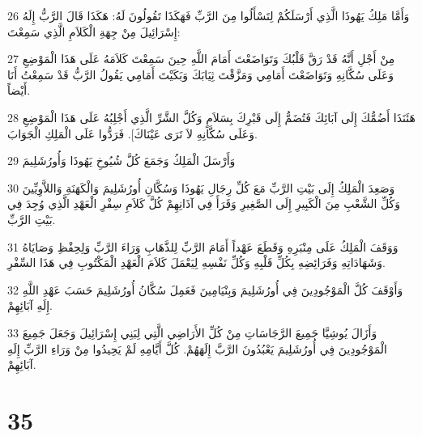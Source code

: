 \par 26 وَأَمَّا مَلِكُ يَهُوذَا الَّذِي أَرْسَلَكُمْ لِتَسْأَلُوا مِنَ الرَّبِّ فَهَكَذَا تَقُولُونَ لَهُ: هَكَذَا قَالَ الرَّبُّ إِلَهُ إِسْرَائِيلَ مِنْ جِهَةِ الْكَلاَمِ الَّذِي سَمِعْتَ:
\par 27 مِنْ أَجْلِ أَنَّهُ قَدْ رَقَّ قَلْبُكَ وَتَوَاضَعْتَ أَمَامَ اللَّهِ حِينَ سَمِعْتَ كَلاَمَهُ عَلَى هَذَا الْمَوْضِعِ وَعَلَى سُكَّانِهِ وَتَوَاضَعْتَ أَمَامِي وَمَزَّقْتَ ثِيَابَكَ وَبَكَيْتَ أَمَامِي يَقُولُ الرَّبُّ قَدْ سَمِعْتُ أَنَا أَيْضاً.
\par 28 هَئَنَذَا أَضُمُّكَ إِلَى آبَائِكَ فَتُضَمُّ إِلَى قَبْرِكَ بِسَلاَمٍ وَكُلَّ الشَّرِّ الَّذِي أَجْلِبُهُ عَلَى هَذَا الْمَوْضِعِ وَعَلَى سُكَّانِهِ لاَ تَرَى عَيْنَاكَ]. فَرَدُّوا عَلَى الْمَلِكِ الْجَوَابَ.
\par 29 وَأَرْسَلَ الْمَلِكُ وَجَمَعَ كُلَّ شُيُوخِ يَهُوذَا وَأُورُشَلِيمَ
\par 30 وَصَعِدَ الْمَلِكُ إِلَى بَيْتِ الرَّبِّ مَعَ كُلِّ رِجَالِ يَهُوذَا وَسُكَّانِ أُورُشَلِيمَ وَالْكَهَنَةِ وَاللاَّوِيِّينَ وَكُلِّ الشَّعْبِ مِنَ الْكَبِيرِ إِلَى الصَّغِيرِ وَقَرَأَ فِي آذَانِهِمْ كُلَّ كَلاَمِ سِفْرِ الْعَهْدِ الَّذِي وُجِدَ فِي بَيْتِ الرَّبِّ.
\par 31 وَوَقَفَ الْمَلِكُ عَلَى مِنْبَرِهِ وَقَطَعَ عَهْداً أَمَامَ الرَّبِّ لِلذَّهَابِ وَرَاءَ الرَّبِّ وَلِحِفْظِ وَصَايَاهُ وَشَهَادَاتِهِ وَفَرَائِضِهِ بِكُلِّ قَلْبِهِ وَكُلِّ نَفْسِهِ لِيَعْمَلَ كَلاَمَ الْعَهْدِ الْمَكْتُوبِ فِي هَذَا السِّفْرِ.
\par 32 وَأَوْقَفَ كُلَّ الْمَوْجُودِينَ فِي أُورُشَلِيمَ وَبِنْيَامِينَ فَعَمِلَ سُكَّانُ أُورُشَلِيمَ حَسَبَ عَهْدِ اللَّهِ إِلَهِ آبَائِهِمْ.
\par 33 وَأَزَالَ يُوشِيَّا جَمِيعَ الرَّجَاسَاتِ مِنْ كُلِّ الأَرَاضِي الَّتِي لِبَنِي إِسْرَائِيلَ وَجَعَلَ جَمِيعَ الْمَوْجُودِينَ فِي أُورُشَلِيمَ يَعْبُدُونَ الرَّبَّ إِلَهَهُمْ. كُلَّ أَيَّامِهِ لَمْ يَحِيدُوا مِنْ وَرَاءِ الرَّبِّ إِلَهِ آبَائِهِمْ.

\chapter{35}

